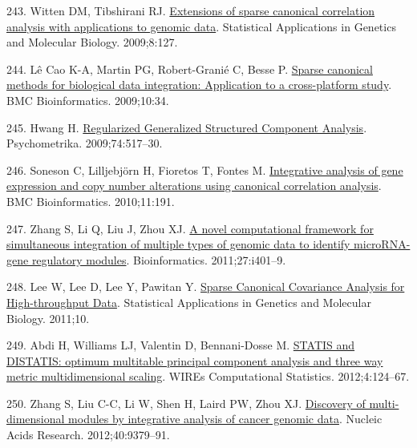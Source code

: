 \documentclass[
  12pt,
  a4paper,
  twoside,
  openright]{book}
\newlength{\cslhangindent}
\newlength{\cslentryspacingunit} %
\newenvironment{CSLReferences}[2] %
 {%
  \setlength{\parindent}{0pt}
  \ifodd #1
  \let\oldpar\par
  \def\par{\hangindent=\cslhangindent\oldpar}
  \fi
  \setlength{\parskip}{#2\cslentryspacingunit}
 }%
 {}
\begin{document}
\begin{CSLReferences}{0}{0}
\leavevmode{}%
243. Witten DM, Tibshirani RJ. \href{https://doi.org/10.2202/1544-6115.1470}{Extensions of sparse canonical correlation analysis with applications to genomic data}. Statistical Applications in Genetics and Molecular Biology. 2009;8:127.

\leavevmode{}%
244. Lê Cao K-A, Martin PG, Robert-Granié C, Besse P. \href{https://doi.org/10.1186/1471-2105-10-34}{Sparse canonical methods for biological data integration: Application to a cross-platform study}. BMC Bioinformatics. 2009;10:34.

\leavevmode{}%
245. Hwang H. \href{https://doi.org/10.1007/s11336-009-9119-y}{Regularized Generalized Structured Component Analysis}. Psychometrika. 2009;74:517--30.

\leavevmode{}%
246. Soneson C, Lilljebjörn H, Fioretos T, Fontes M. \href{https://doi.org/10.1186/1471-2105-11-191}{Integrative analysis of gene expression and copy number alterations using canonical correlation analysis}. BMC Bioinformatics. 2010;11:191.

\leavevmode{}%
247. Zhang S, Li Q, Liu J, Zhou XJ. \href{https://doi.org/10.1093/bioinformatics/btr206}{A novel computational framework for simultaneous integration of multiple types of genomic data to identify microRNA-gene regulatory modules}. Bioinformatics. 2011;27:i401--9.

\leavevmode{}%
248. Lee W, Lee D, Lee Y, Pawitan Y. \href{https://doi.org/10.2202/1544-6115.1638}{Sparse Canonical Covariance Analysis for High-throughput Data}. Statistical Applications in Genetics and Molecular Biology. 2011;10.

\leavevmode{}%
249. Abdi H, Williams LJ, Valentin D, Bennani-Dosse M. \href{https://doi.org/10.1002/wics.198}{STATIS and DISTATIS: optimum multitable principal component analysis and three way metric multidimensional scaling}. WIREs Computational Statistics. 2012;4:124--67.

\leavevmode{}%
250. Zhang S, Liu C-C, Li W, Shen H, Laird PW, Zhou XJ. \href{https://doi.org/10.1093/nar/gks725}{Discovery of multi-dimensional modules by integrative analysis of cancer genomic data}. Nucleic Acids Research. 2012;40:9379--91.


\end{CSLReferences}
\end{document}
